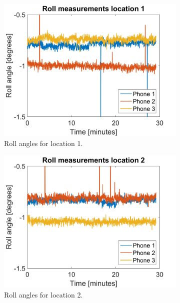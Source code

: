 \documentclass[a4paper, notitlepage]{report}
\begin{document}
\begin{figure}[H]
\begin{adjustwidth}{-1in}{-1in}
	\vspace{10pt}
	\begin{subfigure}{0.33\textwidth}
		\includegraphics[width=\textwidth]{figures/orientation/ro_loc1}
		\caption{Roll angles for location 1.}
		\label{app:orientation_ro_loc1}
	\end{subfigure}
	\begin{subfigure}{0.33\textwidth}
		\includegraphics[width=\textwidth]{figures/orientation/ro_loc2}
		\caption{Roll angles for location 2.}
		\label{app:orientation_ro_loc2}
	\end{subfigure}
	\begin{subfigure}{0.33\textwidth}

\end{subfigure}
\end{adjustwidth}
\end{figure}
\end{document}
